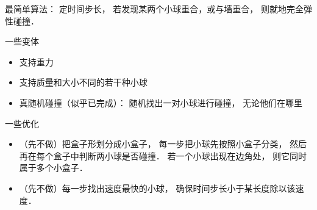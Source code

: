 
最简单算法： 定时间步长， 若发现某两个小球重合，或与墙重合， 则就地完全弹性碰撞．

一些变体
\begin{itemize}
\item 支持重力
\item 支持质量和大小不同的若干种小球
\item 真随机碰撞（似乎已完成）： 随机找出一对小球进行碰撞， 无论他们在哪里
\end{itemize}

一些优化
\begin{itemize}
\item （先不做）把盒子形划分成小盒子， 每一步把小球先按照小盒子分类， 然后再在每个盒子中判断两小球是否碰撞． 若一个小球出现在边角处， 则它同时属于多个小盒子．
\item （先不做）每一步找出速度最快的小球， 确保时间步长小于某长度除以该速度．
\end{itemize}
